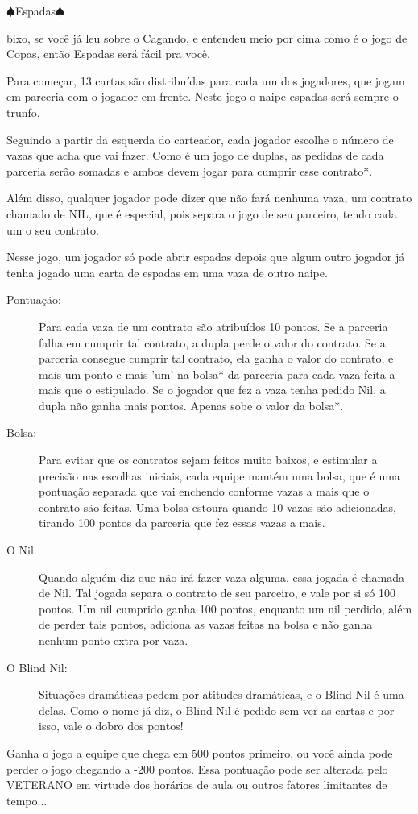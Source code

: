 \begin{subsecao}{$\spadesuit$Espadas$\spadesuit$} 

bixo, se você já leu sobre o Cagando, e entendeu meio por cima como é o jogo de
Copas, então Espadas será fácil pra você. 

Para começar, 13 cartas são distribuídas para cada um dos jogadores, que jogam
em parceria com o jogador em frente. Neste jogo o naipe espadas será sempre o
trunfo.

Seguindo a partir da esquerda do carteador, cada jogador escolhe o número de
vazas que acha que vai fazer. Como é um jogo de duplas, as pedidas de cada
parceria serão somadas e ambos devem jogar para cumprir esse contrato*. 

Além disso, qualquer jogador pode dizer que não fará nenhuma vaza, um contrato
chamado de NIL, que é especial, pois separa o jogo de seu parceiro, tendo cada
um o seu contrato.

Nesse jogo, um jogador só pode abrir espadas depois que algum outro jogador já
tenha jogado uma carta de espadas em uma vaza de outro naipe.
\begin{description}

\item[Pontuação:]

Para cada vaza de um contrato são atribuídos 10 pontos. Se a parceria falha em
cumprir tal contrato, a dupla perde o valor do contrato. Se a parceria consegue
cumprir tal contrato, ela ganha o valor do contrato, e mais um ponto e
mais 'um' na bolsa* da parceria para cada vaza feita a mais que o estipulado.
Se o jogador que fez a vaza tenha pedido Nil, a dupla não ganha mais pontos.
Apenas sobe o valor da bolsa*.

\item[Bolsa:]

Para evitar que os contratos sejam feitos muito baixos, e estimular a precisão
nas escolhas iniciais, cada equipe mantém uma bolsa, que é uma pontuação
separada que vai enchendo conforme vazas a mais que o contrato são feitas. Uma
bolsa estoura quando 10 vazas são adicionadas, tirando 100 pontos da parceria
que fez essas vazas a mais.

\item[O Nil:]
Quando alguém diz que não irá fazer vaza alguma, essa jogada é chamada de Nil.
Tal jogada separa o contrato de seu parceiro, e vale por si só 100 pontos. Um
nil cumprido ganha 100 pontos, enquanto um nil perdido, além de perder tais
pontos, adiciona as vazas feitas na bolsa e não ganha nenhum ponto extra por
vaza.

\item[O Blind Nil:]
Situações dramáticas pedem por atitudes dramáticas, e o Blind Nil é uma delas.
Como o nome já diz, o Blind Nil é pedido sem ver as cartas e por isso, vale o
dobro dos pontos!

\end{description}
Ganha o jogo a equipe que chega em 500 pontos primeiro, ou você ainda pode
perder o jogo chegando a -200 pontos. Essa pontuação pode ser alterada pelo
VETERANO em virtude dos horários de aula ou outros fatores limitantes de
tempo...

\end{subsecao}
